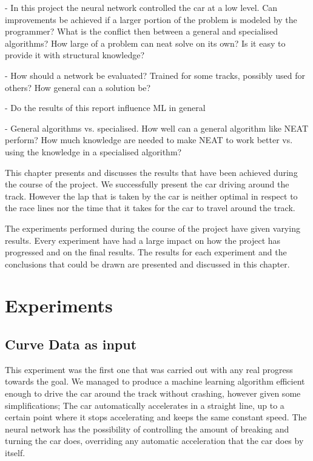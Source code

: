 - In this project the neural network controlled the car at a low level. Can improvements be achieved if a larger portion of the problem is modeled by the programmer? What is the conflict then between a general and specialised algorithms? How large of a problem can neat solve on its own? Is it easy to provide it with structural knowledge?

- How should a network be evaluated? Trained for some tracks, possibly used for others? How general can a solution be?

- Do the results of this report influence ML in general

- General algorithms vs. specialised. How well can a general algorithm like NEAT perform? How much knowledge are needed to make NEAT to work better vs. using the knowledge in a specialised algorithm?

\iffalse

This chapter presents and discusses the results that have been achieved during the course of the project. We successfully present the car driving around the track. However the lap that is taken by the car is neither optimal in respect to the race lines nor the time that it takes for the car to travel around the track.

The experiments performed during the course of the project have given varying results. Every experiment have had a large impact on how the project has progressed and on the final results. The results for each experiment and the conclusions that could be drawn are presented and discussed in this chapter.

\section{Experiments}

\subsection{Curve Data as input}
This experiment was the first one that was carried out with any real progress towards the goal. We managed to produce a machine learning algorithm efficient enough to drive the car around the track without crashing, however given some simplifications; The car automatically accelerates in a straight line, up to a certain point where it stops accelerating and keeps the same constant speed. The neural network has the possibility of controlling the amount of breaking and turning the car does, overriding any automatic acceleration that the car does by itself.

